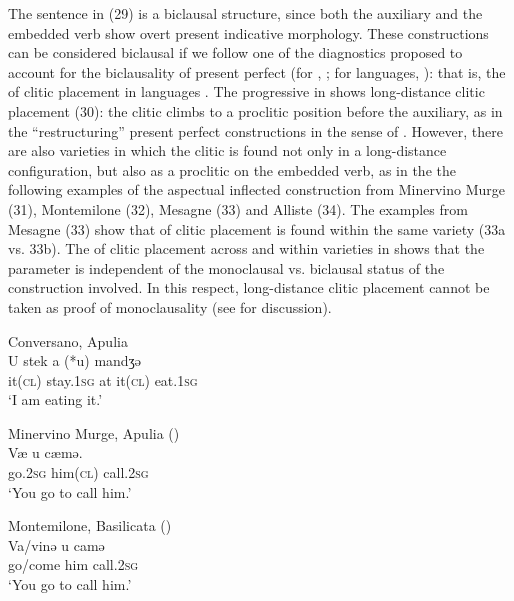 \documentclass[output=paper]{langsci/langscibook}
\begin{document}
The sentence in (29) is a biclausal structure, since both the auxiliary and the embedded verb show overt present indicative morphology. These constructions can be considered biclausal if we follow one of the diagnostics proposed to account for the biclausality of present perfect (for , \citealt{Chomsky1957,Chomsky1981,Chomsky1995}; for  languages, \citealt{Kayne1993,Manzini2005,Manzini2007,Manzini2011Bio}): that is, the  of clitic placement in  languages \citep{Manzini2011Bio}. The progressive in  shows long-distance clitic placement (30): the clitic climbs to a proclitic position before the auxiliary, as in the ``restructuring'' present perfect constructions in the sense of \citet{Rizzi1982}. However, there are also varieties in which the clitic is found not only in a long-distance configuration, but also as a proclitic on the embedded verb, as in the the following examples of the aspectual inflected construction from Minervino Murge (31), Montemilone (32), Mesagne (33) and Alliste (34). The examples from Mesagne (33) show that  of clitic placement is found within the same variety (33a vs. 33b). The  of clitic placement across and within varieties in  shows that the parameter is independent of the monoclausal vs. biclausal status of the construction involved. In this respect, long-distance clitic placement cannot be taken as proof of monoclausality (see \citealt{Manzini2011Bio,Manzini2017} for discussion).

\ea%
         Conversano, Apulia\label{ex:lorusso:30}\\
    \gll U   stek    a   (*u)  mandʒə \\
         it\textsc{(cl)} stay.\textsc{1sg} at  it\textsc{(cl)} eat.\textsc{1sg} \\
    \glt ‘I am eating it.’
\z

\ea%
         Minervino Murge, Apulia (\citealt{Manzini2005})\label{ex:lorusso:31}\\
    \gll Væ     u    cæmə. \\
         go.\textsc{2sg} him(\textsc{cl})   call.\textsc{2sg}    \\
    \glt ‘You go to call him.’ 
    \z

\ea%
         Montemilone, Basilicata (\citealt{Manzini2005})\label{ex:lorusso:32}\\
    \gll Va/vinə   u    camə         \\
         go/come  him   call.\textsc{2sg}\\
    \glt ‘You go to call him.’ 
    \z
\end{document}
